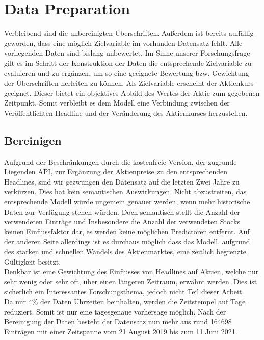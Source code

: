 \chapter{Data Preparation}
Verbleibend sind die unbereinigten Überschriften.
Außerdem ist bereits auffällig geworden, dass eine möglich Zielvariable im vorhanden Datensatz fehlt. Alle vorliegenden Daten sind bislang unbewertet. Im Sinne unserer Forschungsfrage gilt es im Schritt der Konstruktion der Daten die entsprechende Zielvariable zu evaluieren und zu ergänzen, um so eine geeignete Bewertung bzw. Gewichtung der Überschriften herleiten zu können.
Als Zielvariable erscheint der Aktienkurs geeignet. Dieser bietet ein objektives Abbild des Wertes der Aktie zum gegebenen Zeitpunkt. Somit verbleibt es dem Modell eine Verbindung zwischen der Veröffentlichten Headline und der Veränderung des Aktienkurses herzustellen.

\section*{Bereinigen}
Aufgrund der Beschränkungen durch die kostenfreie Version, der zugrunde Liegenden API, zur Ergänzung der Aktienpreise zu den entsprechenden Headlines, sind wir gezwungen den Datensatz auf die letzten Zwei Jahre zu verkürzen.
Dies hat kein semantischen Auswirkungen. Nicht abzustreiten, das entsprechende Modell würde ungemein genauer werden, wenn mehr historische Daten zur Verfügung stehen würden. Doch semantisch stellt die Anzahl der verwendeten Einträge und Insbesondere die Anzahl der verwendeten Stocks keinen Einflussfaktor dar, es werden keine möglichen Predictoren entfernt. Auf der anderen Seite allerdings ist es durchaus möglich dass das Modell, aufgrund des starken und schnellen Wandels des Aktienmarktes, eine zeitlich begrenzte Gültigkeit besitzt. \\
Denkbar ist eine Gewichtung des Einflusses von Headlines auf Aktien, welche nur sehr wenig oder sehr oft, über einen längeren Zeitraum, erwähnt werden. Dies ist sicherlich ein Interessantes Forschungsthema, jedoch nicht Teil dieser Arbeit.\\
Da nur 4\% der Daten Uhrzeiten beinhalten, werden die Zeitstempel auf Tage reduziert. Somit ist nur eine tagesgenaue vorhersage möglich.
Nach der Bereinigung der Daten besteht der Datensatz nun mehr aus rund 164698 Einträgen mit einer Zeitspanne vom 21.August 2019 bis zum 11.Juni 2021.\\

